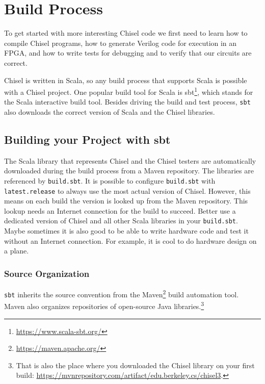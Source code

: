 \documentclass[%
    10pt,
    headinclude, footexclude,
    openright, %
    notitlepage,
    cleardoubleempty,
    headsepline,
    pointlessnumbers,
    bibtotoc, idxtotoc,
    ]{scrbook}
\newcommand{\code}[1]{{\small{\texttt{#1}}}}
\newcommand{\myref}[2]{\href{#1}{#2}}
\renewcommand{\myref}[2]{{#2}{\footnote{\url{#1}}}}
\begin{document}
\chapter{Build Process}

To get started with more interesting Chisel code we first need to learn how to compile
Chisel programs, how to generate Verilog code for execution in an FPGA, and how
to write tests for debugging and to verify that our circuits are correct.

Chisel is written in Scala, so any build process that supports Scala is possible
with a Chisel project. One popular build tool for Scala is \myref{https://www.scala-sbt.org/}{sbt},
which stands for the Scala interactive build tool.
Besides driving the build and test process, \code{sbt} also downloads the correct
version of Scala and the Chisel libraries.

\section{Building your Project with sbt}


The Scala library that represents Chisel and the Chisel testers are automatically
downloaded during the build process from a Maven repository.
The libraries are referenced by \code{build.sbt}. It is possible to configure \code{build.sbt}
with \code{latest.release} to always use the most actual version of Chisel.
However, this means on each build the version is looked up from the Maven
repository. This lookup needs an Internet connection for the build to succeed.
Better use a dedicated version of Chisel and all other Scala libraries in your \code{build.sbt}.
Maybe sometimes it is also good to be able to write hardware code and test it without an Internet connection.
For example, it is cool to do hardware design on a plane.

\subsection{Source Organization}


\code{sbt} inherits the source convention from the \myref{https://maven.apache.org/}{Maven}
build automation tool. Maven also organizes repositories of open-source Java libraries.\footnote{That is
also the place where you downloaded the Chisel library on your first build:
\url{https://mvnrepository.com/artifact/edu.berkeley.cs/chisel3}.}
\end{document}

